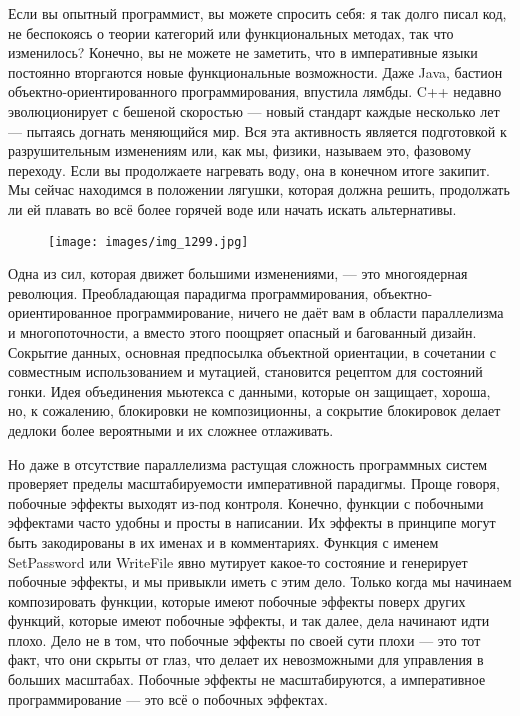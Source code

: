 Если вы опытный программист, вы можете спросить себя: я так долго писал код, 
не беспокоясь о теории категорий или функциональных методах, так что изменилось? 
Конечно, вы не можете не заметить, что в императивные языки постоянно вторгаются 
новые функциональные возможности. Даже Java, бастион объектно-ориентированного 
программирования, впустила лямбды. C++ недавно эволюционирует с бешеной скоростью 
--- новый стандарт каждые несколько лет --- пытаясь догнать меняющийся мир. Вся 
эта активность является подготовкой к разрушительным изменениям или, как мы, 
физики, называем это, фазовому переходу. Если вы продолжаете нагревать воду, 
она в конечном итоге закипит. Мы сейчас находимся в положении лягушки, которая 
должна решить, продолжать ли ей плавать во всё более горячей воде или начать 
искать альтернативы.

\begin{figure}[H]
  \centering
  \texttt{[image: images/img\_1299.jpg]}
\end{figure}

\noindent
Одна из сил, которая движет большими изменениями, --- это многоядерная революция. 
Преобладающая парадигма программирования, объектно-ориентированное программирование, 
ничего не даёт вам в области параллелизма и многопоточности, а вместо этого 
поощряет опасный и багованный дизайн. Сокрытие данных, основная предпосылка 
объектной ориентации, в сочетании с совместным использованием и мутацией, 
становится рецептом для состояний гонки. Идея объединения мьютекса с данными, 
которые он защищает, хороша, но, к сожалению, блокировки не композиционны, 
а сокрытие блокировок делает дедлоки более вероятными и их сложнее отлаживать.

Но даже в отсутствие параллелизма растущая сложность программных систем 
проверяет пределы масштабируемости императивной парадигмы. Проще говоря, 
побочные эффекты выходят из-под контроля. Конечно, функции с побочными эффектами 
часто удобны и просты в написании. Их эффекты в принципе могут быть закодированы 
в их именах и в комментариях. Функция с именем SetPassword или WriteFile явно 
мутирует какое-то состояние и генерирует побочные эффекты, и мы привыкли иметь 
с этим дело. Только когда мы начинаем композировать функции, которые имеют 
побочные эффекты поверх других функций, которые имеют побочные эффекты, и так 
далее, дела начинают идти плохо. Дело не в том, что побочные эффекты по своей 
сути плохи --- это тот факт, что они скрыты от глаз, что делает их невозможными 
для управления в больших масштабах. Побочные эффекты не масштабируются, а 
императивное программирование --- это всё о побочных эффектах.

